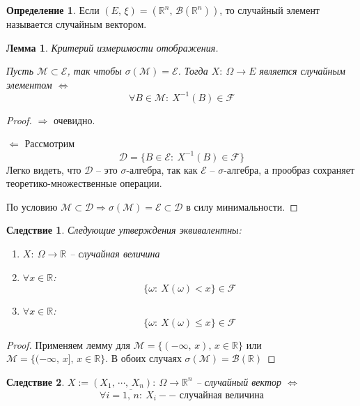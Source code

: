 \documentclass[a4paper,12pt]{article}
\renewcommand{\leq}{\ensuremath{\leqslant}}
\theoremstyle{plain}
\newtheorem{lemma}{Лемма}[section]
\newtheorem*{corollary}{Следствие}
\theoremstyle{definition}
\newtheorem{definition}{Определение}[section]
\theoremstyle{remark}
\begin{document}
\begin{definition}
  Если $(E,\,\xi) = (\mathbb{R}^n,\, \mathcal{B}(\mathbb{R}^n))$, то случайный элемент называется случайным вектором.
\end{definition}

\begin{lemma}
  Критерий измеримости отображения.

  Пусть $\mathcal{M} \subset \mathcal{E}$, так чтобы $\sigma(\mathcal{M}) = \mathcal{E}$.
  Тогда $X:\: \Omega \to E$ является случайным элементом $\Leftrightarrow$
  \[\forall B \in \mathcal{M}:\: X^{-1}(B) \in \mathcal{F}\]
\end{lemma}

\begin{proof}
  $\Rightarrow$ очевидно.

  $\Leftarrow$ Рассмотрим
  \[\mathcal{D} = \{B \in \mathcal{E}:\: X^{-1}(B) \in \mathcal{F}\}\]
  Легко видеть, что $\mathcal{D}$ -- это $\sigma$-алгебра, так как $\mathcal{E}$ -- $\sigma$-алгебра, а прообраз сохраняет теоретико-множественные операции.

  По условию $\mathcal{M} \subset \mathcal{D} \Rightarrow \sigma(\mathcal{M}) = \mathcal{E} \subset \mathcal{D}$ в силу минимальности.
\end{proof}

\begin{corollary}
  Следующие утверждения эквивалентны:
  \begin{enumerate}
    \item $X:\: \Omega \to \mathbb{R}$ -- случайная величина
    \item $\forall x \in \mathbb{R}$:
    \[\{\omega:\: X(\omega) < x\} \in \mathcal{F}\]
    \item $\forall x \in \mathbb{R}$:
    \[\{\omega:\: X(\omega) \leq x\} \in \mathcal{F}\]
  \end{enumerate}
\end{corollary}

\begin{proof}
  Применяем лемму для $\mathcal{M} = \{(-\infty,\,x),\, x \in \mathbb{R}\}$ или $\mathcal{M} = \{(-\infty,\,x],\, x \in \mathbb{R}\}$. В обоих случаях $\sigma(\mathcal{M}) = \mathcal{B}(\mathbb{R})$
\end{proof}

\begin{corollary}
  $X := (X_1,\,\cdots,\,X_n):\: \Omega \to \mathbb{R}^n$ -- случайный вектор $\Leftrightarrow$
  \[\forall i = \overline{1,\,n}:\: X_i -- \text{ случайная величина}\]
\end{corollary}
\end{document}
